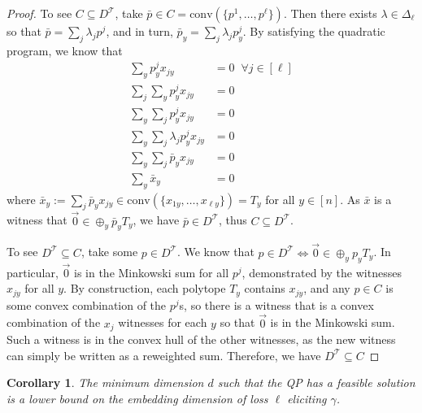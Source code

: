 \documentclass[12pt]{article}
\newcommand{\Comments}{1}
\newcommand{\mytodo}[2]{\ifnum\Comments=1%
  \todo[linecolor=#1!80!black,backgroundcolor=#1,bordercolor=#1!80!black]{#2}\fi}
\newcommand{\jessiet}[1]{\mytodo{purple!20!white}{JF: #1}}
\newcommand{\T}{\mathcal{T}}
\newcommand{\conv}{\mathrm{conv}}
\newtheorem{corollary}{Corollary}
\begin{document}
\begin{proof}
    To see $C \subseteq D^\T$, take $\bar p \in C = \conv(\{p^1, \ldots, p^\ell\})$.
    Then there exists $\lambda \in \Delta_{\ell}$ so that $\bar p = \sum_j \lambda_j p^j$, and in turn, $\bar p_y = \sum_j \lambda_j p^j_y$.
    By satisfying the quadratic program, we know that 
    \begin{align*}
    \sum_y p^j_y x_{jy} &= 0 \;\; \forall j \in [\ell]\\
    \sum_j \sum_y p^j_y x_{jy} &= 0\\
    \sum_y \sum_j p^j_y x_{jy} &= 0\\
    \sum_y \sum_j \lambda_j p^j_y x_{jy} &= 0\\
    \sum_y \sum_j \bar p_y x_{jy} &= 0\\
    \sum_y \bar x_y &= 0 
    \end{align*}
    where $\bar x_y := \sum_j \bar p_y x_{jy} \in \conv(\{x_{1y}, \ldots, x_{\ell y}\}) = T_y$ for all $y \in [n]$.
    As $\bar x$ is a witness that $\vec 0 \in \oplus_y \bar p_y T_y$, we have $\bar p \in D^\T$, thus $C\subseteq D^\T$.
        
    To see $D^\T \subseteq C$, take some $p \in D^\T$.
    We know that $p \in D^\T \iff \vec 0 \in \oplus_y p_y T_y$.  
    In particular, $\vec 0$ is in the Minkowski sum for all $p^j$, demonstrated by the witnesses $x_{jy}$ for all $y$.
    By construction, each polytope $T_y$ contains $x_{jy}$, and any $p\in C$ is some convex combination of the $p^j$s, so there is a witness that is a convex combination of the $x_{j}$ witnesses for each $y$ so that $\vec 0$ is in the Minkowski sum.
    Such a witness is in the convex hull of the other witnesses, as the new witness can simply be written as a reweighted sum.
    Therefore, we have $D^\T \subseteq C$
    
  \end{proof}

  \begin{corollary}
  	The minimum dimension $d$ such that the QP has a feasible solution is a lower bound on the embedding dimension of loss $\ell$ eliciting $\gamma$. 
  \end{corollary}
  
  
\end{document}
